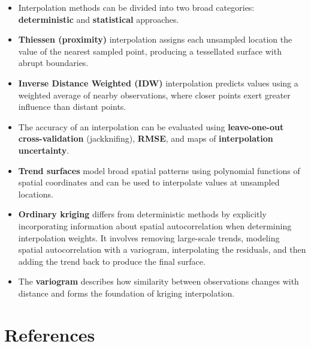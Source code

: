 \documentclass[
  letterpaper,
]{book}
\begin{document}
\begin{itemize}
\item
  Interpolation methods can be divided into two broad categories:
  \textbf{deterministic} and \textbf{statistical} approaches.
\item
  \textbf{Thiessen (proximity)} interpolation assigns each unsampled
  location the value of the nearest sampled point, producing a
  tessellated surface with abrupt boundaries.
\item
  \textbf{Inverse Distance Weighted (IDW)} interpolation predicts values
  using a weighted average of nearby observations, where closer points
  exert greater influence than distant points.
\item
  The accuracy of an interpolation can be evaluated using
  \textbf{leave-one-out cross-validation} (jackknifing), \textbf{RMSE},
  and maps of \textbf{interpolation uncertainty}.
\item
  \textbf{Trend surfaces} model broad spatial patterns using polynomial
  functions of spatial coordinates and can be used to interpolate values
  at unsampled locations.
\item
  \textbf{Ordinary kriging} differs from deterministic methods by
  explicitly incorporating information about spatial autocorrelation
  when determining interpolation weights. It involves removing
  large-scale trends, modeling spatial autocorrelation with a variogram,
  interpolating the residuals, and then adding the trend back to produce
  the final surface.
\item
  The \textbf{variogram} describes how similarity between observations
  changes with distance and forms the foundation of kriging
  interpolation.
\end{itemize}

\chapter*{References}\label{references}

\end{document}
